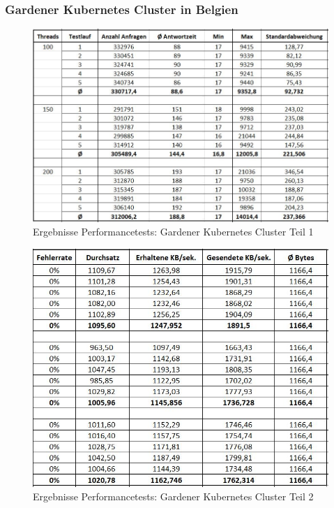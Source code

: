 \subsubsection{Gardener Kubernetes Cluster in Belgien}
\label{section_performance_k8s_gardener}
\begin{figure}[h]
	\begin{center}
		\includegraphics[width=16cm]{img/performance_k8s_1.JPG}
		\caption[Performancetests: Gardener Kubernetes Cluster Teil 1]{Ergebnisse Performancetests: Gardener Kubernetes Cluster Teil 1}
		\label{performance_k8s_1}
	\end{center}
\end{figure}
\newpage
\begin{figure}[h]
	\begin{center}
		\includegraphics[width=16cm]{img/performance_k8s_2.JPG}
		\caption[Performancetests: Gardener Kubernetes Cluster Teil 2]{Ergebnisse Performancetests: Gardener Kubernetes Cluster Teil 2}
		\label{performance_k8s_2}
	\end{center}
\end{figure}
\newpage
